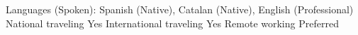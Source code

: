 \begin{cvskills}
\cvskill
{Languages (Spoken):} %
{Spanish (Native), Catalan (Native), English (Professional)} %
\cvskill
{National traveling} %
{Yes}
\cvskill
{International traveling} %
{Yes}
\cvskill
{Remote working}
{Preferred}
\end{cvskills}
